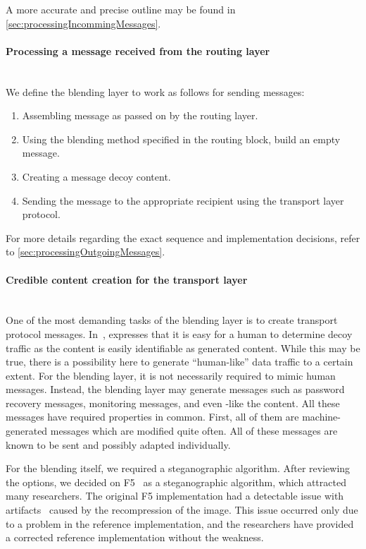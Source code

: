 A more accurate and precise outline may be found in \cref{sec:processingIncommingMessages}.

\paragraph{Processing a message received from the routing layer}~\\
We define the blending layer to work as follows for sending messages:
\begin{enumerate}
	\item Assembling message as passed on by the routing layer.
	\item Using the blending method specified in the routing block, build an empty message. 
	\item Creating a message decoy content.
	\item Sending the message to the appropriate recipient using the transport layer protocol.
\end{enumerate}

For more details regarding the exact sequence and implementation decisions, refer to \cref{sec:processingOutgoingMessages}.

\paragraph{Credible content creation for the transport layer}~\\
One of the most demanding tasks of the blending layer is to create transport protocol messages. In~\cite{oakland2013-parrot}, \citeauthor{oakland2013-parrot} expresses that it is easy for a human to determine decoy traffic as the content is easily identifiable as generated content. While this may be true, there is a possibility here to generate ``human-like'' data traffic to a certain extent. For the blending layer, it is not necessarily required to mimic human messages. Instead, the blending layer may generate messages such as password recovery messages, monitoring messages, and even -like the content. All these messages have required properties in common. First, all of them are machine-generated messages which are modified quite often. All of these messages are known to be sent and possibly adapted individually. 

For the blending itself, we required a steganographic algorithm. After reviewing the options, we decided on F5~\cite{f5} as a steganographic algorithm, which attracted many researchers. The original F5 implementation had a detectable issue with artifacts~\cite{F5broken} caused by the recompression of the image. This issue occurred only due to a problem in the reference implementation, and the researchers have provided a corrected reference implementation without the weakness.

